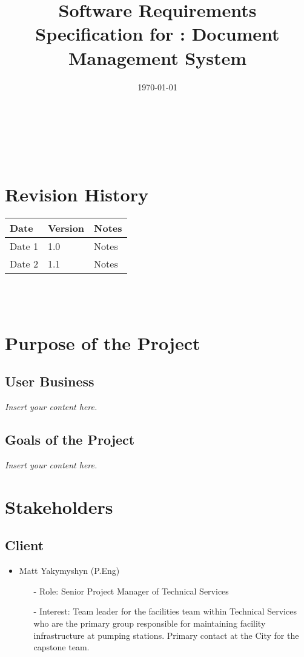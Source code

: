 \documentclass[12pt]{article}
\newcommand{\lips}{\textit{Insert your content here.}}
\begin{document}
\title{Software Requirements Specification for \progname: Document Management System} 
\author{\authname}
\date{\today}
	
\maketitle

~\newpage


\tableofcontents

~\newpage

\section*{Revision History}

\begin{tabularx}{\textwidth}{p{3cm}p{2cm}X}
\toprule {\textbf{Date}} & {\textbf{Version}} & {\textbf{Notes}}\\
\midrule
Date 1 & 1.0 & Notes\\
Date 2 & 1.1 & Notes\\
\bottomrule
\end{tabularx}

~\\

~\newpage
\section{Purpose of the Project}
\subsection{User Business}
\lips
\subsection{Goals of the Project}
\lips
\section{Stakeholders}
\subsection{Client}

\begin{itemize}
\item Matt Yakymyshyn (P.Eng)
    \begin{itemize}
        \item[-] Role: Senior Project Manager of Technical Services
        \item[-] Interest: Team leader for the facilities team within
        Technical Services who are the primary group responsible for 
        maintaining facility infrastructure at pumping stations.
        Primary contact at the City for the capstone team.
    \end{itemize}
\end{itemize}
\end{document}
